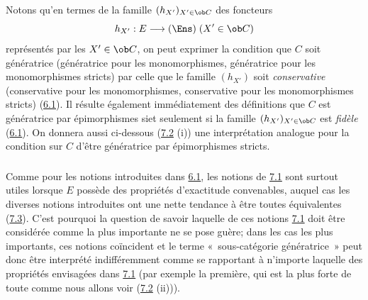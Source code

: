 \setcounter{subsection}{1} \setcounter{subsubsection}{0}
\subsubsection{}
Notons qu'en termes de la famille $(h_{X'})_{X'\in \ob C}$ des
foncteurs
$$
h_{X'}:E\longrightarrow (\Ens)\; (X'\in \ob C)
$$
représentés par les $X'\in \ob C$, on peut exprimer la condition que
$C$ soit génératrice (\resp  génératrice pour les
monomorphismes,
\resp  génératrice pour les monomorphismes stricts) par celle que le
famille $(h_{X'})$ soit \emph{conservative} (\resp  conservative
pour les monomorphismes, \resp  conservative pour les monomorphismes
stricts) (\hyperref[I.def6.1]{6.1}). Il résulte également immédiatement des
définitions que $C$ est génératrice par épimorphismes
si\pageoriginale et seulement si la famille $(h_{X'})_{X'\in \ob C}$
est \emph{fidèle} (\hyperref[I.def6.1]{6.1}). On donnera aussi ci-dessous
(\hyperref[I.prop7.2]{7.2} (i)) une interprétation analogue pour la condition
sur $C$ d'être génératrice par épimorphismes stricts.

\subsubsection{}
Comme pour les notions introduites dans \hyperref[I.def6.1]{6.1}, les notions
de \hyperref[I.def7.1]{7.1} sont surtout utiles lorsque $E$ possède des
propriétés d'exactitude convenables, auquel cas les diverses notions
introduites ont une nette tendance à être toutes équivalentes
(\hyperref[I.cor7.3]{7.3}). C'est pourquoi la question de savoir laquelle de
ces notions \hyperref[I.def7.1]{7.1} doit être considérée comme la plus
importante ne se pose guère; dans les cas les plus importants, ces
notions coïncident et le terme « sous-catégorie
génératrice »
peut donc être interprété indifféremment comme se
rapportant à
n'importe laquelle des propriétés envisagées dans \hyperref[I.def7.1]{7.1}
(par exemple la première, qui est la plus forte de toute comme nous
allons voir (\hyperref[I.prop7.2]{7.2} (ii))).

